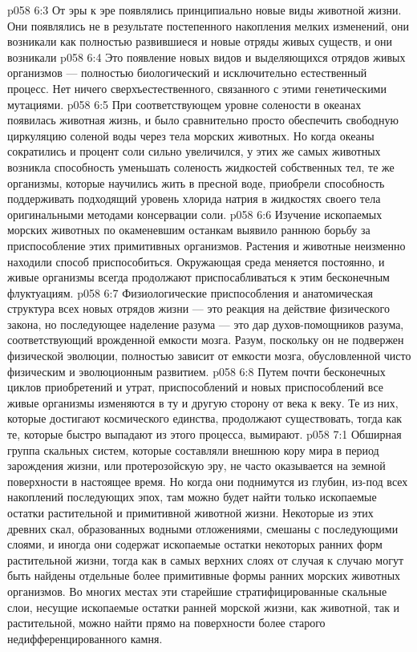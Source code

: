\vs p058 6:3 От эры к эре появлялись принципиально новые виды животной жизни. Они появлялись не в результате постепенного накопления мелких изменений, они возникали как полностью развившиеся и новые отряды живых существ, и они возникали 
\vs p058 6:4 Это  появление новых видов и выделяющихся отрядов живых организмов --- полностью биологический и исключительно естественный процесс. Нет ничего сверхъестественного, связанного с этими генетическими мутациями.
\vs p058 6:5 При соответствующем уровне солености в океанах появилась животная жизнь, и было сравнительно просто обеспечить свободную циркуляцию соленой воды через тела морских животных. Но когда океаны сократились и процент соли сильно увеличился, у этих же самых животных возникла способность уменьшать соленость жидкостей собственных тел, те же организмы, которые научились жить в пресной воде, приобрели способность поддерживать подходящий уровень хлорида натрия в жидкостях своего тела оригинальными методами консервации соли.
\vs p058 6:6 Изучение ископаемых морских животных по окаменевшим останкам выявило раннюю борьбу за приспособление этих примитивных организмов. Растения и животные неизменно находили способ приспособиться. Окружающая среда меняется постоянно, и живые организмы всегда продолжают приспосабливаться к этим бесконечным флуктуациям.
\vs p058 6:7 Физиологические приспособления и анатомическая структура всех новых отрядов жизни --- это реакция на действие физического закона, но последующее наделение разума --- это дар духов\hyp{}помощников разума, соответствующий врожденной емкости мозга. Разум, поскольку он не подвержен физической эволюции, полностью зависит от емкости мозга, обусловленной чисто физическим и эволюционным развитием.
\vs p058 6:8 Путем почти бесконечных циклов приобретений и утрат, приспособлений и новых приспособлений все живые организмы изменяются в ту и другую сторону от века к веку. Те из них, которые достигают космического единства, продолжают существовать, тогда как те, которые быстро выпадают из этого процесса, вымирают.
\vs p058 7:1 Обширная группа скальных систем, которые составляли внешнюю кору мира в период зарождения жизни, или протерозойскую эру, не часто оказывается на земной поверхности в настоящее время. Но когда они поднимутся из глубин, из\hyp{}под всех накоплений последующих эпох, там можно будет найти только ископаемые остатки растительной и примитивной животной жизни. Некоторые из этих древних скал, образованных водными отложениями, смешаны с последующими слоями, и иногда они содержат ископаемые остатки некоторых ранних форм растительной жизни, тогда как в самых верхних слоях от случая к случаю могут быть найдены отдельные более примитивные формы ранних морских животных организмов. Во многих местах эти старейшие стратифицированные скальные слои, несущие ископаемые остатки ранней морской жизни, как животной, так и растительной, можно найти прямо на поверхности более старого недифференцированного камня.
